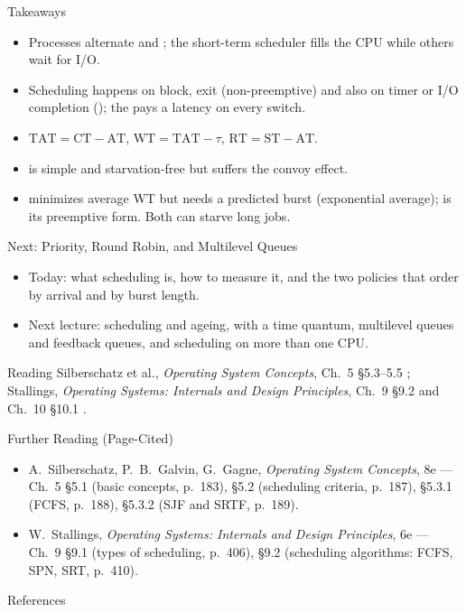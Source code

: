 \documentclass[aspectratio=169]{beamer}
\begin{document}
\begin{frame}{Takeaways}
  \begin{itemize}
    \item Processes alternate  and ; the
      short-term scheduler fills the CPU while others wait for I/O.
    \item Scheduling happens on block, exit (non-preemptive) and also on
      timer or I/O completion (); the  pays a
      latency on every switch.
    \item $\mathrm{TAT} = \mathrm{CT} - \mathrm{AT}$,
      $\mathrm{WT} = \mathrm{TAT} - \tau$,
      $\mathrm{RT} = \mathrm{ST} - \mathrm{AT}$.
    \item {} is simple and starvation-free but suffers the convoy
      effect.
    \item {} minimizes average WT but needs a predicted burst
      (exponential average);  is its preemptive form. Both can
      starve long jobs.
  \end{itemize}
\end{frame}

\begin{frame}{Next: Priority, Round Robin, and Multilevel Queues}
  \begin{itemize}
    \item Today: what scheduling is, how to measure it, and the two policies
      that order by arrival and by burst length.
    \item Next lecture:  scheduling and ageing,  with a time quantum, multilevel queues and feedback queues, and
      scheduling on more than one CPU.
  \end{itemize}
  \vspace{0.3cm}
  \begin{block}{Reading}
    Silberschatz et al., \emph{Operating System Concepts}, Ch.~5
    \S5.3--5.5 \cite{SilberschatzOSC_operating_system_concepts}; Stallings,
    \emph{Operating Systems: Internals and Design Principles}, Ch.~9
    \S9.2 and Ch.~10 \S10.1 \cite{StallingsOS_internals_design_principles}.
  \end{block}
\end{frame}

\begin{frame}{Further Reading (Page-Cited)}
  \footnotesize
  \begin{itemize}
    \item A.~Silberschatz, P.~B.~Galvin, G.~Gagne, \emph{Operating System
      Concepts}, 8e --- Ch.~5 \S5.1 (basic concepts, p.~183), \S5.2
      (scheduling criteria, p.~187), \S5.3.1 (FCFS, p.~188), \S5.3.2
      (SJF and SRTF, p.~189).
    \item W.~Stallings, \emph{Operating Systems: Internals and Design
      Principles}, 6e --- Ch.~9 \S9.1 (types of scheduling, p.~406), \S9.2
      (scheduling algorithms: FCFS, SPN, SRT, p.~410).
  \end{itemize}
  \vspace{0.2cm}
\end{frame}

\begin{frame}[allowframebreaks]{References}
  \footnotesize
  
  \nocite{SilberschatzOSC_operating_system_concepts,StallingsOS_internals_design_principles}
  
\end{frame}
\end{document}
